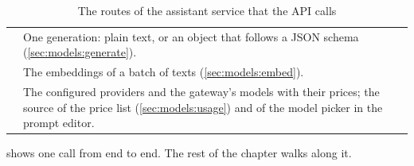 \begin{table}[H]
\caption{The routes of the assistant service that the API calls}\label{tab:models:routes}
\begin{tabularx}{\textwidth}{@{}L{58mm}Y@{}}
\toprule
{} &  \\
\midrule
{} & One generation: plain text, or an object that follows a JSON schema (\cref{sec:models:generate}). \\
 & The embeddings of a batch of texts (\cref{sec:models:embed}). \\
 & The configured providers and the gateway's models with their prices; the source of the price list (\cref{sec:models:usage}) and of the model picker in the prompt editor. \\
\bottomrule
\end{tabularx}
\end{table}

 shows one call from end to end. The rest of the chapter walks along
it.

